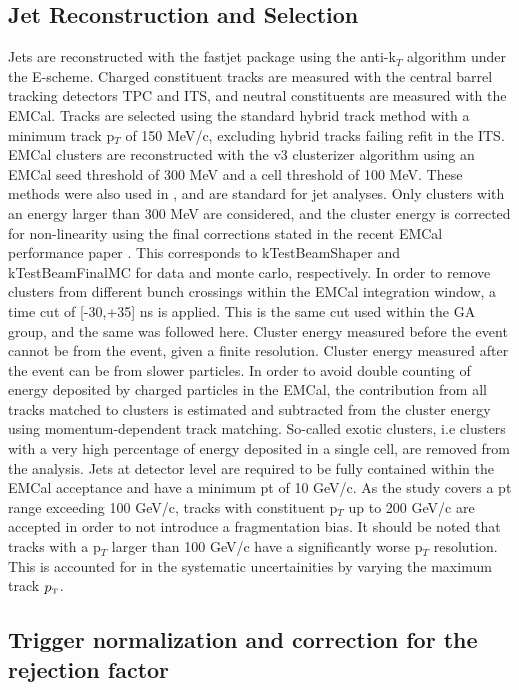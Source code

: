 \documentclass[ALICE]{ALICE_analysis_notes}
\newcommand{\pT}{$p_{\mbox{\tiny T}}$\xspace}
\begin{document}
\subsection{Jet Reconstruction and Selection}
\label{sec:JetRecoSel}

Jets are reconstructed with the fastjet package using the anti-k$_T$ algorithm under the E-scheme. Charged constituent tracks are measured with the central barrel tracking detectors TPC and ITS, and neutral constituents are measured with the EMCal. Tracks are selected using the standard hybrid track method with a minimum track p$_T$ of 150 MeV/c, excluding hybrid tracks failing refit in the ITS. EMCal clusters are reconstructed with the v3 clusterizer algorithm using an EMCal seed threshold of 300 MeV and a cell threshold of 100 MeV. These methods were also used in \cite{anaNoteMFasel}, and are standard for jet analyses. Only clusters with an energy larger than 300 MeV are considered, and the cluster energy is corrected for non-linearity using the final corrections stated in the recent EMCal performance paper \cite{EMCalPerformance2022}. This corresponds to kTestBeamShaper and kTestBeamFinalMC for data and monte carlo, respectively. In order to remove clusters from different bunch crossings within the EMCal integration window, a time cut of [-30,+35] ns is applied. This is the same cut used within the GA group, and the same was followed here. Cluster energy measured before the event cannot be from the event, given a finite resolution. Cluster energy measured after the event can be from slower particles. In order to avoid double counting of energy deposited by charged particles in the EMCal, the contribution from all tracks matched to clusters is estimated and subtracted from the cluster energy using momentum-dependent track matching. So-called exotic clusters, i.e clusters with a very high percentage of energy deposited in a single cell, are removed from the analysis. Jets at detector level are required to be fully contained within the EMCal acceptance and have a minimum pt of 10 GeV/c. As the study covers a pt range exceeding 100 GeV/c, tracks with constituent p$_T$ up to 200 GeV/c are accepted in order to not introduce a fragmentation bias. It should be noted that tracks with a p$_T$ larger than 100 GeV/c have a significantly worse p$_T$ resolution. This is accounted for in the systematic uncertainities by varying the maximum track \pT.

\subsection{Trigger normalization and correction for the rejection factor}
\label{sec:triggerCorrection}
\end{document}

